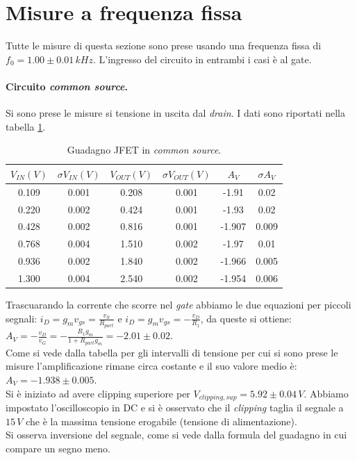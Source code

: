\documentclass[10pt,a4paper]{article}
\newcommand{\rem}[1]{[\emph{#1}]}
\begin{document}
\section{Misure a frequenza fissa}
Tutte le misure di questa sezione sono prese usando una frequenza fissa di $f_0 = 1.00\pm0.01\, kHz$. L'ingresso del circuito in entrambi i casi è al gate.
\paragraph{Circuito \emph{common source}.}
Si sono prese le misure si tensione in uscita dal \emph{drain}. I dati sono riportati nella tabella \ref{tabellaCommonSource}.

\begin{table}[!htb]\centering
\begin{tabular}{|c|c|c|c|c|c|}
\hline
$V_{IN} (V)$ & $\sigma V_{IN} (V)$ & $V_{OUT} (V)$ & $\sigma V_{OUT} (V)$ & $A_V$ & $\sigma A_V$\\
\hline
0.109 & 0.001 & 0.208 & 0.001 & -1.91 & 0.02\\
0.220 & 0.002 & 0.424 & 0.001 & -1.93 & 0.02\\
0.428 & 0.002 & 0.816 & 0.001 & -1.907 & 0.009\\
0.768 & 0.004 & 1.510 & 0.002 & -1.97 & 0.01\\
0.936 & 0.002 & 1.840 & 0.002 & -1.966 & 0.005\\
1.300 & 0.004 & 2.540 & 0.002 & -1.954 & 0.006\\
\hline
\end{tabular}
\caption{Guadagno JFET in \emph{common source}.}
\label{tabellaCommonSource}
\end{table}

Trascuarando la corrente che scorre nel \emph{gate} abbiamo le due equazioni per piccoli segnali: $i_D = g_m v_{gs} = \frac{v_S}{R_{part}}$ e $i_D = g_m v_{gs} = -\frac{v_D}{R_1}$, da queste si ottiene: $A_V = -\frac{v_D}{v_G} = - \frac{R_1 g_m}{1+R_{part} g_m} = -2.01\pm0.02$. \\
Come si vede dalla tabella per gli intervalli di tensione per cui si sono prese le misure l'amplificazione rimane circa costante e il suo valore medio è: $A_V = -1.938\pm0.005$. \\
Si è iniziato ad avere clipping superiore per $V_{clipping, sup} = 5.92\pm0.04 \, V$. Abbiamo impostato l'oscilloscopio in DC e si è osservato che il \emph{clipping} taglia il segnale a $15\,V$ che è la massima tensione erogabile (tensione di alimentazione).\\
\rem{spiegare perchè non c'è clipping inferiore}
Si osserva inversione del segnale, come si vede dalla formula del guadagno in cui compare un segno meno.\\
\end{document}
